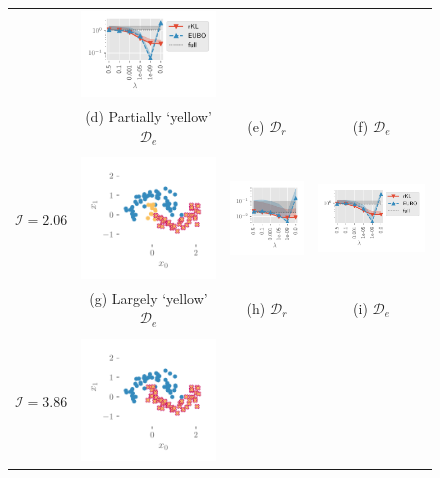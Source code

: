 \documentclass{article}
\theoremstyle{definition}
\newcommand{\mcl}[1]{\mathcal{#1}}
\newcommand{\dc}{\mcl{D}_r}
\newcommand{\dr}{\mcl{D}_e}
\begin{document}
\begin{figure}
\begin{tabular}{@{}c@{}c@{}c@{}c@{}}
&
\includegraphics[trim={3mm 0mm 3mm 3mm}, clip,height=0.22\textwidth]{img/likelihood_diff/moon_rm_30_gauss_fullcov_likelihood_remove_retrain_f_legend.pdf}
\\
&
(d) Partially `yellow' $\dr$
&
(e) $\dc$
&
(f) $\dr$
\\
\\
$\mcl{I} = 2.06$
&
\includegraphics[trim={0mm 0mm 3mm 3mm}, clip,height=0.22\textwidth]{img/moon/moon_rm_40_data.pdf}
&
\includegraphics[trim={3mm 0mm 3mm 3mm}, clip,height=0.22\textwidth]{img/likelihood_diff/moon_rm_40_gauss_fullcov_likelihood_remain_retrain_f.pdf}
&
\includegraphics[trim={3mm 0mm 3mm 3mm}, clip,height=0.22\textwidth]{img/likelihood_diff/moon_rm_40_gauss_fullcov_likelihood_remove_retrain_f_legend.pdf}
\\
&
(g) Largely  `yellow' $\dr$
&
(h) $\dc$
&
(i) $\dr$
\\
\\
$\mcl{I} = 3.86$
&
\includegraphics[trim={0mm 0mm 3mm 3mm}, clip,height=0.22\textwidth]{img/moon/moon_rm_50_data.pdf}

\end{tabular}
\end{figure}
\end{document}
